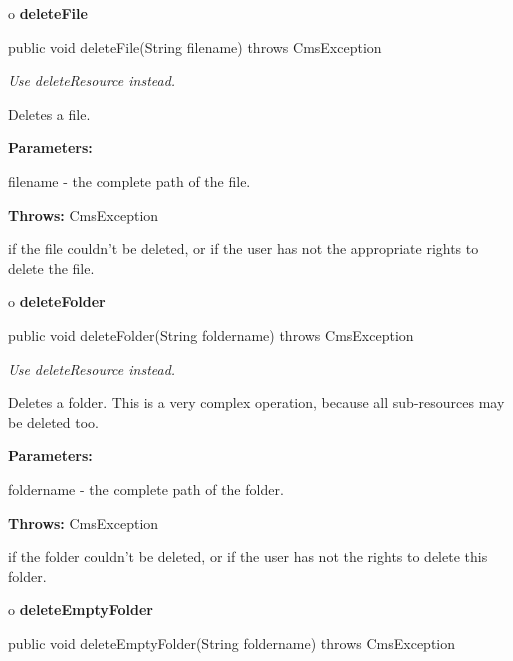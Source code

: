 o {\bf deleteFile}

\begin{PRE}
 public void deleteFile(String filename) throws CmsException
\end{PRE}

\begin{description}
 {\it Use deleteResource
instead.}

Deletes a file.

\begin{description}
\item {\bf Parameters:}

filename - the complete path of the file.
\item {\bf Throws:} CmsException

if the file couldn't be deleted, or if the user has not the appropriate rights
to delete the file.
\end{description}

\end{description}

o {\bf deleteFolder}

\begin{PRE}
 public void deleteFolder(String foldername) throws CmsException
\end{PRE}

\begin{description}
 {\it Use deleteResource
instead.}

Deletes a folder. \htmlBR
This is a very complex operation, because all sub-resources may be deleted
too.

\begin{description}
\item {\bf Parameters:}

foldername - the complete path of the folder.
\item {\bf Throws:} CmsException

if the folder couldn't be deleted, or if the user has not the rights to delete
this folder.
\end{description}

\end{description}

o {\bf deleteEmptyFolder}

\begin{PRE}
 public void deleteEmptyFolder(String foldername) throws CmsException
\end{PRE}

